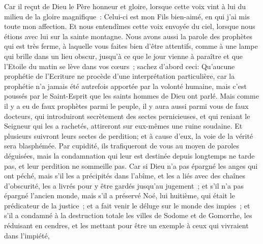\begin{multicols}{2}
Car il reçut de Dieu le Père honneur et gloire, lorsque cette voix vint à lui du milieu de la gloire magnifique~: Celui-ci est mon Fils bien-aimé, en qui j'ai mis toute mon affection.
Et nous entendîmes cette voix envoyée du ciel, lorsque nous étions avec lui sur la sainte montagne.
Nous avons aussi la parole des prophètes qui est très ferme, à laquelle vous faites bien d'être attentifs, comme à une lampe qui brille dans un lieu obscur, jusqu'à ce que le jour vienne à paraître et que l'Etoile du matin se lève dans vos cœurs~;
sachez d'abord ceci: Qu'aucune prophétie de l'Ecriture ne procède d'une interprétation particulière,
car la prophétie n'a jamais été autrefois apportée par la volonté humaine, mais c'est poussés par le Saint-Esprit que les saints hommes de Dieu ont parlé.
\VerseOne{}Mais comme il y a eu de faux prophètes parmi le peuple, il y aura aussi parmi vous de faux docteurs, qui introduiront secrètement des sectes pernicieuses, et qui reniant le Seigneur qui les a rachetés, attireront sur eux-mêmes une ruine soudaine.
Et plusieurs suivront leurs sectes de perdition; et à cause d'eux, la voie de la vérité sera blasphémée.
Par cupidité, ils trafiqueront de vous au moyen de paroles déguisées, mais la condamnation qui leur est destinée depuis longtemps ne tarde pas, et leur perdition ne sommeille pas.
Car si Dieu n'a pas épargné les anges qui ont péché, mais s'il les a précipités dans l'abîme, et les a liés avec des chaînes d'obscurité, les a livrés pour y être gardés jusqu'au jugement~;
et s'il n'a pas épargné l'ancien monde, mais s'il a préservé Noé, lui huitième, qui était le prédicateur de la justice~; et a fait venir le déluge sur le monde des impies~;
et s'il a condamné à la destruction totale les villes de Sodome et de Gomorrhe, les réduisant en cendres, et les mettant pour être un exemple à ceux qui vivraient dans l'impiété,

\end{multicols}
